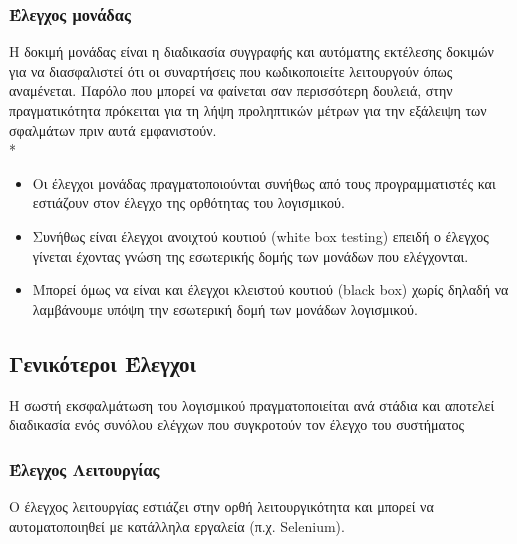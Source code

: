 \documentclass[a4paper, 11pt]{article}
\begin{document}
{{\subsubsection{Έλεγχος μονάδας}
Η δοκιμή μονάδας είναι η διαδικασία συγγραφής και αυτόματης εκτέλεσης δοκιμών για να διασφαλιστεί ότι οι συναρτήσεις που κωδικοποιείτε λειτουργούν όπως αναμένεται. Παρόλο που μπορεί να φαίνεται σαν περισσότερη δουλειά, στην πραγματικότητα πρόκειται για τη λήψη προληπτικών μέτρων για την εξάλειψη των σφαλμάτων πριν αυτά εμφανιστούν.\\*

\begin{itemize}
\item Οι έλεγχοι μονάδας πραγματοποιούνται συνήθως από τους
προγραμματιστές και εστιάζουν στον έλεγχο της ορθότητας του
λογισμικού.
\item Συνήθως είναι έλεγχοι ανοιχτού κουτιού (white box testing) επειδή
ο έλεγχος γίνεται έχοντας γνώση της εσωτερικής δομής των
μονάδων που ελέγχονται.
\item Μπορεί όμως να είναι και έλεγχοι κλειστού κουτιού (black box)
χωρίς δηλαδή να λαμβάνουμε υπόψη την εσωτερική δομή των
μονάδων λογισμικού.
\end{itemize}

\subsection{Γενικότεροι Έλεγχοι}
Η σωστή εκσφαλμάτωση του λογισμικού πραγματοποιείται ανά στάδια και αποτελεί διαδικασία ενός συνόλου ελέγχων που συγκροτούν τον έλεγχο του συστήματος
\subsubsection{Έλεγχος Λειτουργίας}
Ο έλεγχος λειτουργίας εστιάζει στην ορθή λειτουργικότητα και
μπορεί να αυτοματοποιηθεί με κατάλληλα εργαλεία (π.χ. \textlatin{Selenium}).
}}
\end{document}
